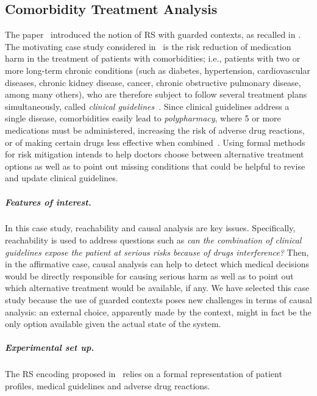 
\subsection{Comorbidity Treatment Analysis}

The paper~\cite{DBLP:conf/cmsb/BowlesBBFGM24} introduced the notion of RS with guarded contexts, as recalled in .
The motivating case study considered in~\cite{DBLP:conf/cmsb/BowlesBBFGM24} is the risk reduction of medication harm in the treatment of patients with comorbidities; i.e., patients with two or more long-term chronic conditions (such as diabetes, hypertension, cardiovascular diseases, chronic kidney disease, cancer, chronic obstructive pulmonary disease, among many others), who are therefore subject to follow several treatment plans simultaneously, called \emph{clinical guidelines}~\cite{feder1999using,woolf1999potential}. Since clinical guidelines address a single disease, comorbidities easily lead to  \emph{polypharmacy}, where 5 or more medications must be administered, increasing the risk of adverse drug reactions, or of making certain drugs less effective when combined~\cite{Gut12}. Using formal methods for risk mitigation intends to help doctors choose between alternative treatment options as well as to point out missing conditions that could be helpful to revise and update clinical guidelines. 

\subparagraph*{Features of interest.}
In this case study, reachability and causal analysis are key issues.
Specifically, reachability is used to address questions such as \emph{can the combination of clinical guidelines expose the patient at serious risks because of drugs interference?}
Then, in the affirmative case, causal analysis can help to detect which medical decisions would be directly responsible for causing serious harm as well as to point out  which alternative treatment would be available, if any.
We have selected this case study because the use of guarded contexts poses new challenges in terms of causal analysis: an external choice, apparently made by the context, might in fact be the only option available given the actual state of the system. 

\subparagraph*{Experimental set up.}
The RS encoding proposed in~\cite{DBLP:conf/cmsb/BowlesBBFGM24} relies on a formal representation of patient profiles, medical guidelines and adverse drug reactions.

